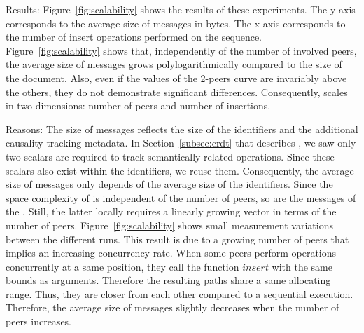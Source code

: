 \begin{asparadesc}
\item [Results:] Figure~\ref{fig:scalability} shows the results of these
  experiments. The y-axis corresponds to the average size of messages in
  bytes. The x-axis corresponds to the number of insert operations performed on
  the sequence. Figure~\ref{fig:scalability} shows that, independently of the
  number of involved peers, the average size of messages grows
  polylogarithmically compared to the size of the document. Also, even if the
  values of the 2-peers curve are invariably above the others, they do not
  demonstrate significant differences. Consequently, \CRATE scales in
  two dimensions: number of peers and number of insertions.
\item [Reasons:] The size of messages reflects the size of the identifiers and
  the additional causality tracking metadata. In Section~\ref{subsec:crdt} that
  describes \CRATE, we saw only two scalars are required to track
  semantically related operations. Since these scalars also exist within the
  identifiers, we reuse them. Consequently, the average size of messages only
  depends of the average size of the identifiers. Since the space complexity of
  \LSEQ is independent of the number of peers, so are the messages of the
  \CRATE. Still, the latter locally requires a linearly growing vector
  in terms of the number of peers. Figure~\ref{fig:scalability} shows small
  measurement variations between the different runs. This result is due to a
  growing number of peers that implies an increasing concurrency rate. When
  some peers perform operations concurrently at a same position, they call the
  function $insert$ with the same bounds as arguments. Therefore the resulting
  paths share a same allocating range. Thus, they are closer from each other
  compared to a sequential execution. Therefore, the average size of messages
  slightly decreases when the number of peers increases.
\end{asparadesc}

